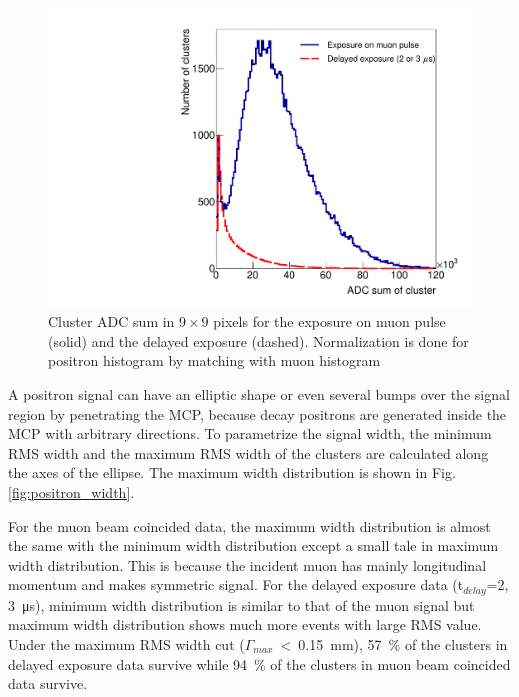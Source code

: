 \documentclass[preprint,3p,twocolumn]{elsarticle}
\begin{document}
\begin{figure}[tb]
	\begin{minipage}[t]{60mm}
		\includegraphics[width=1.30\textwidth, height=1.1\textwidth]{figure/Integ_legend_v2.pdf} %
	\end{minipage}
	\caption{Cluster ADC sum in $9\times9$ pixels for the exposure on muon pulse (solid) and the delayed exposure (dashed).
		Normalization is done for positron histogram by matching with muon histogram}
	\vspace{-0.2cm}
	\label{fig:BPM_int}
\end{figure}

A positron signal can have an elliptic shape or even several bumps over the signal region by penetrating the MCP, because decay positrons are generated inside the MCP with arbitrary directions.
To parametrize the signal width, the minimum RMS width and the maximum RMS width of the clusters are calculated along the axes of the ellipse. The maximum width distribution is shown in Fig.\ref{fig:positron_width}.

For the muon beam coincided data, the maximum width distribution is almost the same with the minimum width distribution except a small tale in maximum width distribution. This is because the incident muon has mainly longitudinal momentum and makes symmetric signal.
For the delayed exposure data (t$_{delay}$={2}, \SI{3}{\micro\s}), minimum width distribution is similar to that of the muon signal but maximum width distribution shows much more events with large RMS value. Under the maximum RMS width cut ($\Gamma_{max}~<~$\SI{0.15}{\mm}), \SI{57}{\percent} of the clusters in delayed exposure data survive while \SI{94}{\percent} of the clusters in muon beam coincided data survive.
\end{document}
